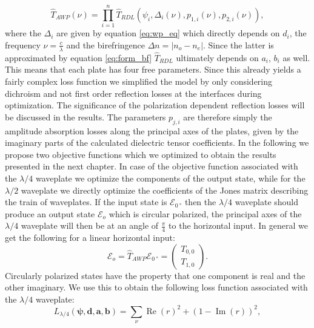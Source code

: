 \begin{equation}
    \hat{T}_{AWP}(\nu) = \prod_{i=1}^{n} \hat{T}_{RDL}(\psi_i, \Delta_i(\nu), p_{1,i}(\nu), p_{2,i}(\nu)),
\end{equation}
where the $\Delta_i$ are given by equation \ref{eq:wp_eq} which directly depends on $d_i$, the frequency $\nu=\frac{c}{\lambda}$ and the birefringence $\Delta n = |n_o - n_e|$. Since the latter is approximated by equation \ref{eq:form_bf} $\hat{T}_{RDL}$ ultimately depends on $a_i$, $b_i$ as well. This means that each plate has four free parameters. Since this already yields a fairly complex loss function we simplified the model by only considering dichroism and not first order reflection losses at the interfaces during optimization. The significance of the polarization dependent reflection losses will be discussed in the results. The parameters $p_{j,i}$ are therefore simply the amplitude absorption losses along the principal axes of the plates, given by the imaginary parts of the calculated dielectric tensor coefficients. In the following we propose two objective functions which we optimized to obtain the results presented in the next chapter. In case of the objective function associated with the $\lambda/4$ waveplate we optimize the components of the output state, while for the $\lambda/2$ waveplate we directly optimize the coefficients of the Jones matrix describing the train of waveplates. If the input state is $\bm{\mathcal{E}}_{\SI{0}{\degree}}$ then the $\lambda/4$ waveplate should produce an output state $\bm{\mathcal{E}}_o$ which is circular polarized, the principal axes of the $\lambda/4$ waveplate will then be at an angle of $\frac{\pi}{4}$ to the horizontal input. In general we get the following for a linear horizontal input:
\begin{equation}
    \bm{\mathcal{E}}_o = \hat{T}_{AWP}\bm{\mathcal{E}}_{\SI{0}{\degree}} =
     \begin{pmatrix} T_{0,0} \\ T_{1,0} \end{pmatrix}.
\end{equation}
Circularly polarized states have the property that one component is real and the other imaginary. We use this to obtain the following loss function associated with the $\lambda/4$ waveplate:
\begin{equation}
    L_{\lambda/4}(\bm{\psi}, \bm{d}, \bm{a}, \bm{b})=
    \sum_{\nu}\operatorname{Re}\left(r\right)^2+\left(1-\operatorname{Im}\left(r\right)\right)^2,
\end{equation}
